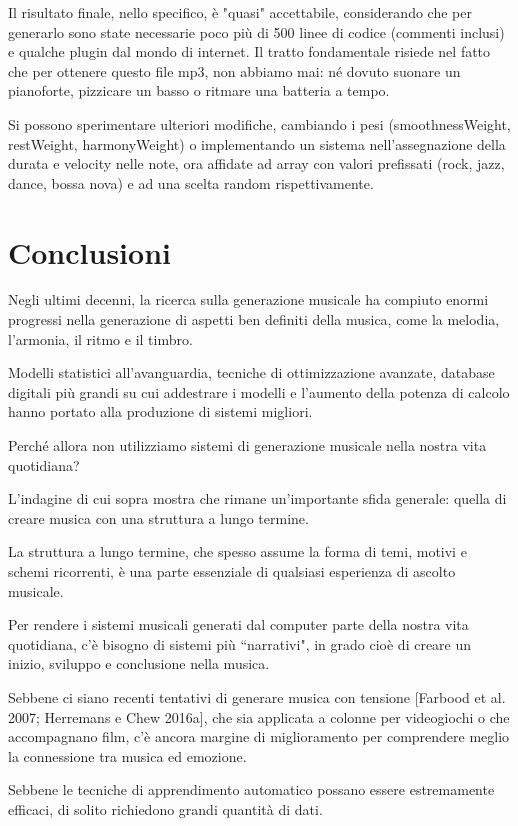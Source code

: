 \documentclass[a4paper,12pt]{report}
\begin{document}
Il risultato finale, nello specifico, è "quasi" accettabile, considerando che per generarlo sono state necessarie poco più di 500 linee di codice (commenti inclusi) e qualche plugin dal mondo di internet.
Il tratto fondamentale risiede nel fatto che per ottenere questo file mp3, non abbiamo mai: né dovuto suonare un pianoforte, pizzicare un basso o ritmare una batteria a tempo.

Si possono sperimentare ulteriori modifiche, cambiando i pesi (smoothnessWeight, restWeight, harmonyWeight) o implementando un sistema nell'assegnazione della durata e velocity nelle note, ora affidate ad array con valori prefissati (rock, jazz, dance, bossa nova) e ad una scelta random rispettivamente.

\chapter{Conclusioni}

Negli ultimi decenni, la ricerca sulla generazione musicale ha compiuto enormi progressi nella generazione di aspetti ben definiti della musica, come la melodia, l’armonia, il ritmo e il timbro. 

Modelli statistici all’avanguardia, tecniche di ottimizzazione avanzate, database digitali più grandi su cui addestrare i modelli e l’aumento della potenza di calcolo hanno portato alla produzione di sistemi migliori. 

Perché allora non utilizziamo sistemi di generazione musicale nella nostra vita quotidiana? 

L’indagine di cui sopra mostra che rimane un’importante sfida generale: quella di creare musica con una struttura a lungo termine.

La struttura a lungo termine, che spesso assume la forma di temi, motivi e schemi ricorrenti, è una parte essenziale di qualsiasi esperienza di ascolto musicale.

Per rendere i sistemi musicali generati dal computer parte della nostra vita quotidiana, c’è bisogno di sistemi più “narrativi", in grado cioè di creare un inizio, sviluppo e conclusione nella musica. 

Sebbene ci siano recenti tentativi di generare musica con tensione [Farbood et al. 2007; Herremans e Chew 2016a], che sia applicata a colonne per videogiochi o che accompagnano film, c’è ancora margine di miglioramento per comprendere meglio la connessione tra musica ed emozione.

Sebbene le tecniche di apprendimento automatico possano essere estremamente efficaci, di solito richiedono grandi quantità di dati. 
\end{document}

